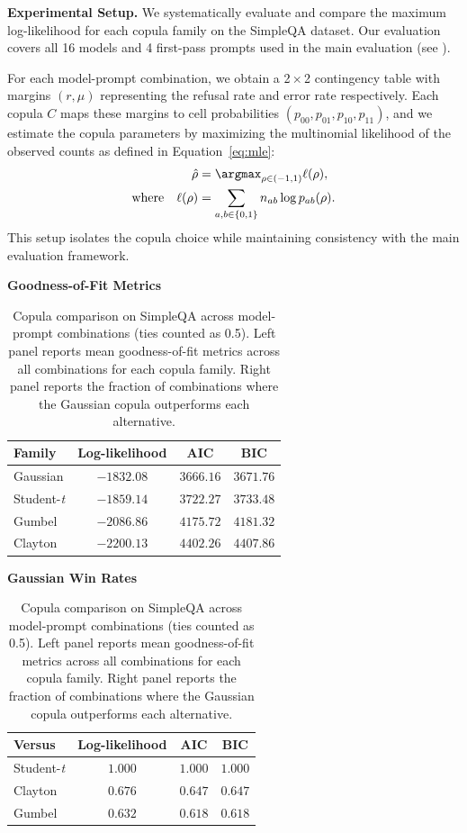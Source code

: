 \noindent\textbf{Experimental Setup.}
We systematically evaluate and compare the maximum log-likelihood for each copula family on the SimpleQA dataset. Our evaluation covers all 16 models and 4 first-pass prompts used in the main evaluation (see ).

For each model-prompt combination, we obtain a 2\,$\times$\,2 contingency table with margins $(r,\mu)$ representing the refusal rate and error rate respectively. Each copula $C$ maps these margins to cell probabilities $(p_{00},p_{01},p_{10},p_{11})$, and we estimate the copula parameters by maximizing the multinomial likelihood of the observed counts as defined in Equation~\ref{eq:mle}:
\begin{align}
\hat{\rho} &= \argmax_{\rho \in (-1,1)} \ell(\rho), \nonumber\\
\text{where} \quad \ell(\rho) &= \sum_{a,b\in\{0,1\}} n_{ab} \log p_{ab}(\rho). \label{eq:mle}
\end{align}
This setup isolates the copula choice while maintaining consistency with the main evaluation framework.

\begin{table}[t]
  \centering
  \small
  \caption{Copula comparison on SimpleQA across model-prompt combinations (ties counted as 0.5). Left panel reports mean goodness-of-fit metrics across all combinations for each copula family. Right panel reports the fraction of combinations where the Gaussian copula outperforms each alternative.}
  \label{tab:copula_comparison}
  \begin{minipage}[t]{0.48\textwidth}
    \centering
    \textbf{Goodness-of-Fit Metrics}
    \begin{tabular}{@{}lccc@{}}
      \toprule
      Family & Log-likelihood & AIC & BIC \\
      \midrule
      Gaussian & $-1832.08$ & $3666.16$ & $3671.76$ \\
      Student-\emph{t} & $-1859.14$ & $3722.27$ & $3733.48$ \\
      Gumbel & $-2086.86$ & $4175.72$ & $4181.32$ \\
      Clayton & $-2200.13$ & $4402.26$ & $4407.86$ \\
      \bottomrule
    \end{tabular}
  \end{minipage}
  \hfill
  \begin{minipage}[t]{0.48\textwidth}
    \centering
    \textbf{Gaussian Win Rates}
    \begin{tabular}{@{}lccc@{}}
      \toprule
      Versus & Log-likelihood & AIC & BIC \\
      \midrule
      Student-\emph{t} & $1.000$ & $1.000$ & $1.000$ \\
      Clayton & $0.676$ & $0.647$ & $0.647$ \\
      Gumbel & $0.632$ & $0.618$ & $0.618$ \\
      \bottomrule
    \end{tabular}
  \end{minipage}
\end{table}

